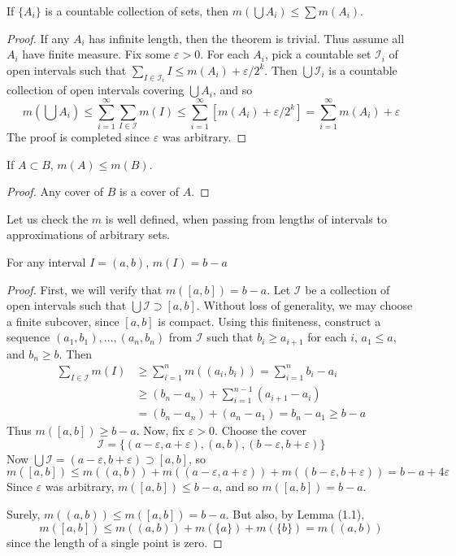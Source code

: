 \begin{theorem}
    If $\{A_i\}$ is a countable collection of sets, then $m(\bigcup A_i) \leq \sum m(A_i)$.
\end{theorem}
\begin{proof}
    If any $A_i$ has infinite length, then the theorem is trivial. Thus assume all $A_i$ have finite measure. Fix some $\varepsilon > 0$. For each $A_i$, pick a countable set $\mathcal{I}_i$ of open intervals such that $\sum_{I \in \mathcal{I}_i} I \leq m(A_i) + \varepsilon/2^k$. Then $\bigcup \mathcal{I}_i$ is a countable collection of open intervals covering $\bigcup A_i$, and so
    \[ m(\bigcup A_i) \leq \sum_{i = 1}^\infty \sum_{I \in \mathcal{I}} m(I) \leq \sum_{i = 1}^\infty [m(A_i) + \varepsilon/2^k] = \sum_{i = 1}^\infty m(A_i) + \varepsilon \]
    The proof is completed since $\varepsilon$ was arbitrary.
\end{proof}

\begin{lemma}
    If $A \subset B$, $m(A) \leq m(B)$.
\end{lemma}
\begin{proof}
    Any cover of $B$ is a cover of $A$.
\end{proof}

Let us check the $m$ is well defined, when passing from lengths of intervals to approximations of arbitrary sets.

\begin{lemma}
    For any interval $I = (a,b)$, $m(I) = b - a$
\end{lemma}
\begin{proof}
    First, we will verify that $m([a,b]) = b - a$. Let $\mathcal{I}$ be a collection of open intervals such that $\bigcup \mathcal{I} \supset [a,b]$. Without loss of generality, we may choose a finite subcover, since $[a,b]$ is compact. Using this finiteness, construct a sequence $(a_1, b_1), \dots, (a_n, b_n)$ from $\mathcal{I}$ such that $b_i \geq a_{i+1}$ for each $i$, $a_1 \leq a$, and $b_n \geq b$. Then
    \begin{align*}
        \sum_{I \in \mathcal{I}} m(I) &\geq \sum_{i = 1}^n m((a_i, b_i)) = \sum_{i = 1}^n b_i - a_i\\
        &\geq (b_n - a_n) + \sum_{i = 1}^{n-1} (a_{i+1} - a_i)\\
        &= (b_n - a_n) + (a_n - a_1) = b_n - a_1 \geq b - a
    \end{align*}
    Thus $m([a,b]) \geq b - a$. Now, fix $\varepsilon > 0$. Choose the cover
    \[ \mathcal{I} = \{ (a-\varepsilon,a+\varepsilon), (a,b), (b-\varepsilon, b+\varepsilon) \} \]
    Now $\bigcup \mathcal{I} = (a-\varepsilon, b+\varepsilon) \supset [a,b]$, so
    \[ m([a,b]) \leq m((a,b)) + m((a-\varepsilon, a+\varepsilon)) + m((b-\varepsilon,b+\varepsilon)) = b - a + 4\varepsilon \]
    Since $\varepsilon$ was arbitrary, $m([a,b]) \leq b - a$, and so $m([a,b]) = b - a$.

    Surely, $m((a,b)) \leq m([a,b]) = b - a$. But also, by Lemma (1.1),
    \[ m([a,b]) \leq m((a,b)) + m(\{a\}) + m(\{b\}) = m((a,b)) \]
    since the length of a single point is zero.
\end{proof}

